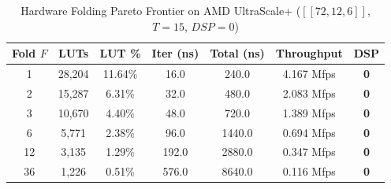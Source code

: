 \begin{table}[t]
\caption{Hardware Folding Pareto Frontier on AMD UltraScale+ ($[[72,12,6]]$, $T=15$, $DSP=0$)}
\label{tab:hardware_folding}
\centering
\begin{tabular}{ccccccc}
\toprule
\textbf{Fold $F$} & \textbf{LUTs} & \textbf{LUT \%} & \textbf{Iter (ns)} & \textbf{Total (ns)} & \textbf{Throughput} & \textbf{DSP} \\
\midrule
 1  & 28,204 & 11.64\% & 16.0  & 240.0  & 4.167 Mfps & \textbf{0} \\
 2  & 15,287 & 6.31\% & 32.0  & 480.0  & 2.083 Mfps & \textbf{0} \\
 3  & 10,670 & 4.40\% & 48.0  & 720.0  & 1.389 Mfps & \textbf{0} \\
 6  & 5,771 & 2.38\% & 96.0  & 1440.0  & 0.694 Mfps & \textbf{0} \\
12  & 3,135 & 1.29\% & 192.0  & 2880.0  & 0.347 Mfps & \textbf{0} \\
36  & 1,226 & 0.51\% & 576.0  & 8640.0  & 0.116 Mfps & \textbf{0} \\
\bottomrule
\end{tabular}
\end{table}

